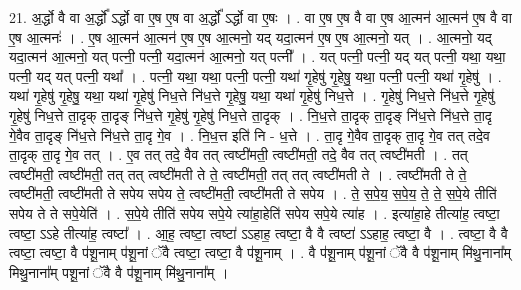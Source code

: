 \documentclass[17pt]{extarticle}
\begin{document}
21. अ॒र्द्धो वै वा अ॒र्द्धो᳚ ऽर्द्धो वा ए॒ष ए॒ष वा अ॒र्द्धो᳚ ऽर्द्धो वा ए॒षः । . वा ए॒ष ए॒ष वै वा ए॒ष आ॒त्मन॑ आ॒त्मन॑ ए॒ष वै वा ए॒ष आ॒त्मनः॑ । . ए॒ष आ॒त्मन॑ आ॒त्मन॑ ए॒ष ए॒ष आ॒त्मनो॒ यद् यदा॒त्मन॑ ए॒ष ए॒ष आ॒त्मनो॒ यत् । . आ॒त्मनो॒ यद् यदा॒त्मन॑ आ॒त्मनो॒ यत् पत्नी॒ पत्नी॒ यदा॒त्मन॑ आ॒त्मनो॒ यत् पत्नी᳚ । . यत् पत्नी॒ पत्नी॒ यद् यत् पत्नी॒ यथा॒ यथा॒ पत्नी॒ यद् यत् पत्नी॒ यथा᳚ । . पत्नी॒ यथा॒ यथा॒ पत्नी॒ पत्नी॒ यथा॑ गृ॒हेषु॑ गृ॒हेषु॒ यथा॒ पत्नी॒ पत्नी॒ यथा॑ गृ॒हेषु॑ । . यथा॑ गृ॒हेषु॑ गृ॒हेषु॒ यथा॒ यथा॑ गृ॒हेषु॑ निध॒त्ते नि॑ध॒त्ते गृ॒हेषु॒ यथा॒ यथा॑ गृ॒हेषु॑ निध॒त्ते । . गृ॒हेषु॑ निध॒त्ते नि॑ध॒त्ते गृ॒हेषु॑ गृ॒हेषु॑ निध॒त्ते ता॒दृक् ता॒दृङ् नि॑ध॒त्ते गृ॒हेषु॑ गृ॒हेषु॑ निध॒त्ते ता॒दृक् । . नि॒ध॒त्ते ता॒दृक् ता॒दृङ् नि॑ध॒त्ते नि॑ध॒त्ते ता॒दृ गे॒वैव ता॒दृङ् नि॑ध॒त्ते नि॑ध॒त्ते ता॒दृ गे॒व । . नि॒ध॒त्त इति॑ नि - ध॒त्ते । . ता॒दृ गे॒वैव ता॒दृक् ता॒दृ गे॒व तत् तदे॒व ता॒दृक् ता॒दृ गे॒व तत् । . ए॒व तत् तदे॒ वैव तत् त्वष्टी॑मती॒ त्वष्टी॑मती॒ तदे॒ वैव तत् त्वष्टी॑मती । . तत् त्वष्टी॑मती॒ त्वष्टी॑मती॒ तत् तत् त्वष्टी॑मती ते ते॒ त्वष्टी॑मती॒ तत् तत् त्वष्टी॑मती ते । . त्वष्टी॑मती ते ते॒ त्वष्टी॑मती॒ त्वष्टी॑मती ते सपेय सपेय ते॒ त्वष्टी॑मती॒ त्वष्टी॑मती ते सपेय । . ते॒ स॒पे॒य॒ स॒पे॒य॒ ते॒ ते॒ स॒पे॒ये तीति॑ सपेय ते ते सपे॒येति॑ । . स॒पे॒ये तीति॑ सपेय सपे॒ये त्या॑हा॒हेति॑ सपेय सपे॒ये त्या॑ह । . इत्या॑हा॒हे तीत्या॑ह॒ त्वष्टा॒ त्वष्टा॒ ऽऽहे तीत्या॑ह॒ त्वष्टा᳚ । . आ॒ह॒ त्वष्टा॒ त्वष्टा॑ ऽऽहाह॒ त्वष्टा॒ वै वै त्वष्टा॑ ऽऽहाह॒ त्वष्टा॒ वै । . त्वष्टा॒ वै वै त्वष्टा॒ त्वष्टा॒ वै प॑शू॒नाम् प॑शू॒नां ॅवै त्वष्टा॒ त्वष्टा॒ वै प॑शू॒नाम् । . वै प॑शू॒नाम् प॑शू॒नां ॅवै वै प॑शू॒नाम् मि॑थु॒नाना᳚म् मिथु॒नाना᳚म् पशू॒नां ॅवै वै प॑शू॒नाम् मि॑थु॒नाना᳚म् । \newline
\end{document}
